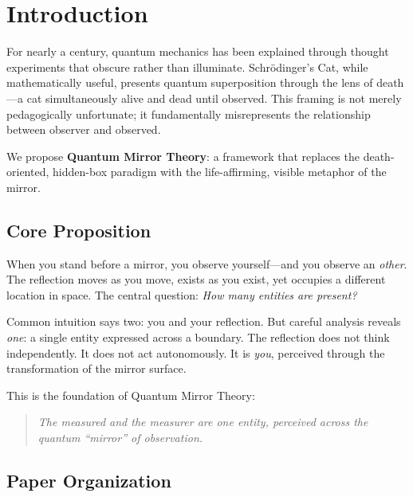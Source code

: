 \documentclass[12pt,a4paper]{article}
\begin{document}
\section{Introduction}

For nearly a century, quantum mechanics has been explained through thought experiments that obscure rather than illuminate. Schrödinger's Cat, while mathematically useful, presents quantum superposition through the lens of death---a cat simultaneously alive and dead until observed. This framing is not merely pedagogically unfortunate; it fundamentally misrepresents the relationship between observer and observed.

We propose \textbf{Quantum Mirror Theory}: a framework that replaces the death-oriented, hidden-box paradigm with the life-affirming, visible metaphor of the mirror.

\subsection{Core Proposition}

When you stand before a mirror, you observe yourself---and you observe an \textit{other}. The reflection moves as you move, exists as you exist, yet occupies a different location in space. The central question: \textit{How many entities are present?}

Common intuition says two: you and your reflection. But careful analysis reveals \textit{one}: a single entity expressed across a boundary. The reflection does not think independently. It does not act autonomously. It is \textit{you}, perceived through the transformation of the mirror surface.

This is the foundation of Quantum Mirror Theory:
\begin{quote}
\textit{The measured and the measurer are one entity, perceived across the quantum ``mirror'' of observation.}
\end{quote}

\subsection{Paper Organization}
\end{document}
